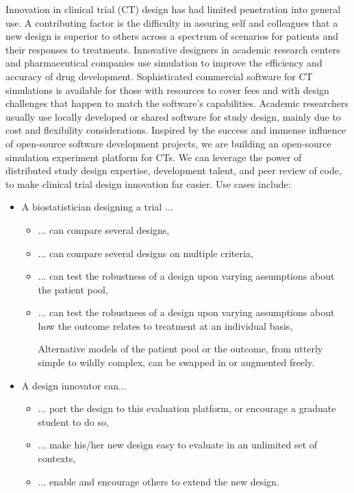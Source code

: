 \documentclass[12pt]{amsart}
\begin{document}
Innovation in clinical trial (CT) design has had limited  penetration into general use.  A contributing factor is the difficulty in assuring self and colleagues that a new design is superior to others across a spectrum of scenarios for patients and their responses to treatments. Innovative designers in academic research centers and pharmaceutical companies use simulation  to improve the efficiency and accuracy of drug development. Sophisticated commercial software for CT simulations is available for those with resources to cover fees and with design challenges that happen to match the software's capabilities. Academic researchers  usually use locally developed or shared software for study design, mainly due to cost and flexibility considerations. 
Inspired by the success and immense influence of open-source software development projects, we are building an open-source simulation experiment platform for CTs. 
We can leverage the power of distributed study design expertise, development talent, and peer review of code,
to make  clinical trial design innovation far easier. Use cases include:
\begin{itemize}
\item A biostatistician designing a trial ...
	\begin{itemize}
	\item ... can compare several designs,
	\item ... can compare several designs on multiple criteria,
	\item ... can test the robustness of a design upon varying assumptions about the patient pool,
	\item ... can test the robustness of a design upon varying assumptions about how the outcome relates to treatment at an individual basis,

Alternative models of the patient pool or the outcome,
from utterly simple to wildly complex, can be 
swapped in or augmented freely. 

	\end{itemize}

	\item A design innovator can...	
	\begin{itemize}
	\item ... port the design to this evaluation platform, or encourage a graduate student to do so,
	\item ... make his/her new design easy to evaluate in an unlimited set of contexts,
	\item ... enable and encourage others to extend the new design.
	\end{itemize}
\end{itemize}
\end{document}
